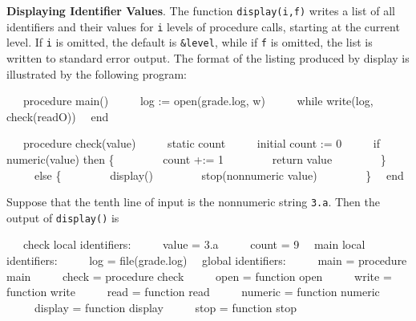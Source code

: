 \textbf{Displaying Identifier Values}. The function
\texttt{display(i,f)} writes a list of all identifiers and their
values for \texttt{i} levels of procedure calls, starting at the
current level. If \texttt{i} is omitted, the default is
\texttt{\&level}, while if \texttt{f} is omitted, the list is written
to standard error output. The format of the listing produced by
display is illustrated by the following program:

{\ttfamily
\ \ \ procedure main()\newline
 \ \ \ \ \ log := open({\textquotedbl}grade.log{\textquotedbl}, {\textquotedbl}w{\textquotedbl})\newline
 \ \ \ \ \ while write(log, check(readO))\newline
 \ \ end}


\bigskip

{\ttfamily
\ \ \ procedure check(value)\newline
 \ \ \ \ \ static count\newline
 \ \ \ \ \ initial count := 0\newline
 \ \ \ \ \ if numeric(value) then \{\newline
 \ \ \ \ \ \ \ \ count +:= 1\newline
 \ \ \ \ \ \ \ \ return value\newline
 \ \ \ \ \ \ \ \ \}\newline
 \ \ \ \ \ else \{\newline
 \ \ \ \ \ \ \ \ display()\newline
 \ \ \ \ \ \ \ \ stop({\textquotedbl}nonnumeric value{\textquotedbl})\newline
 \ \ \ \ \ \ \ \ \}\newline
 \ \ end}


Suppose that the tenth line of input is the nonnumeric string
\texttt{{\textquotedbl}3.a{\textquotedbl}}. Then the output of
\texttt{display()} is

{\ttfamily\mdseries
\ \ \ check local identifiers:\newline
 \ \ \ \ \ value = {\textquotedbl}3.a{\textquotedbl}\newline
 \ \ \ \ \ count = 9\newline
 \ \ main local identifiers:\newline
 \ \ \ \ \ log = file(grade.log)\newline
 \ \ global identifiers:\newline
 \ \ \ \ \ main = procedure main\newline
 \ \ \ \ \ check = procedure check\newline
 \ \ \ \ \ open = function open\newline
 \ \ \ \ \ write = function write\newline
 \ \ \ \ \ read = function read\newline
 \ \ \ \ \ numeric = function numeric\newline
 \ \ \ \ \ display = function display\newline
 \ \ \ \ \ stop = function stop}


